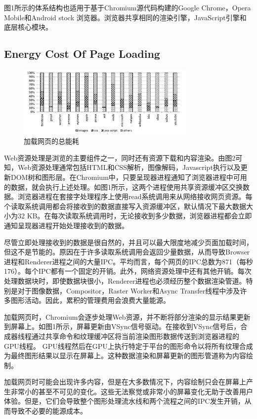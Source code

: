 \documentclass{sig-alternate-05-2015}
\begin{document}
图1所示的体系结构也适用于基于Chromium源代码构建的Google Chrome，Opera Mobile和Android stock 浏览器\cite{6}\cite{8}。浏览器共享相同的渲染引擎，JavaScript引擎和底层核心模块。

\subsection{Energy Cost Of Page Loading}

\begin{figure}[htbp]
	\centering
	\includegraphics[width=3.4in]{./figure6}
	\caption{加载网页的总能耗}\label{fig:tasks}
\end{figure}

Web资源处理是浏览的主要组件之一，同时还有资源下载和内容渲染。由图2\cite{13}可知，Web资源处理通常包括HTML和CSS解析，图像解码，Javascript执行以及更新DOM树和图形层。在Chromium中，只要呈现器进程通知了浏览器进程中可用的数据，就会执行上述处理。如图1所示，这两个进程使用共享资源缓冲区交换数据。浏览器进程在套接字处理程序上使用read系统调用来从网络接收网页资源。每个读取系统调用都会将接收到的数据直接写入资源缓冲区，默认情况下最大数据大小为32 KB。在每次读取系统调用时，无论接收到多少数据，浏览器进程都会立即通知呈现器进程开始处理接收到的数据。

尽管立即处理接收到的数据是很自然的，并且可以最大限度地减少页面加载时间，但这不是节能的。原因在于许多读取系统调用会返回少量数据，从而导致Browser进程和Renderer进程之间的大量IPC。平均而言，每个网页的IPC总数为871（每秒176）。每个IPC都有一个固定的开销。此外，网络资源处理中还有其他开销。每次处理数据块时，即使数据块很小，Renderer进程也必须经历整个数据渲染管道。特别是对于图像数据，Compositor，Raster Worker和Async Transfer线程中涉及许多图形活动。因此，累积的管理费用会浪费大量能源。

加载网页时，Chromium会逐步处理Web资源，并不断将部分渲染的显示结果更新到屏幕上。如图1所示，屏幕更新由VSync信号驱动。在接收到VSync信号后，合成器线程通过共享命令和纹理缓冲区将当前渲染图形数据传送到浏览器进程的GPU线程。 GPU线程然后在GPU上执行特定于平台的图形命令以将所有纹理合成为最终图形结果以显示在屏幕上。这种数据渲染和屏幕更新的图形管道称为内容绘制。

加载网页时可能会出现许多内容，但是在大多数情况下，内容绘制只会在屏幕上产生非常小的甚至不可见的变化。这些无法察觉或非常小的屏幕变化无助于改善用户体验。但是，它们会导致整个图形处理流水线和两个流程之间的IPC发生开销，从而导致不必要的能源成本。
\end{document}

